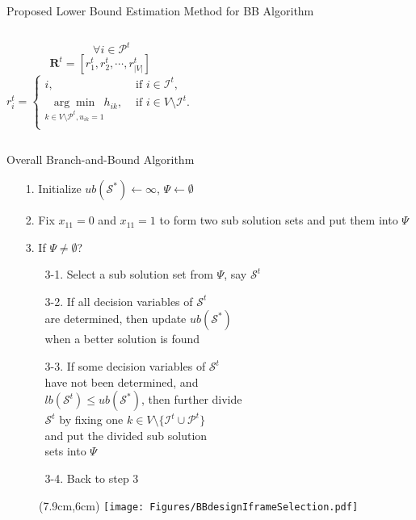 \begin{frame}{Proposed Lower Bound Estimation Method for BB Algorithm}
\begin{columns}
{\begin{equation*}
\quad \quad \forall i \in \mathcal{P}^t
\label{eq::infColumn}
\end{equation*}
}
%
{\tiny
\begin{equation*}
\mathbf{R}^t = [r_1^t,r_2^t,\cdots,r_{|V|}^t]
\end{equation*}
}
%
{\tiny
\begin{equation*}
r_i^t = 
\left\{ \begin{array}{cc}
i,  &\text{ if $i \in \mathcal{I}^t$,} \\                  	   
\underset{k \in V \setminus \mathcal{P}^t, u_{ik}=1}{\arg\min} h_{ik},  &\text{ if $i \in V\setminus \mathcal{I}^t$.} \\
\end{array} \right.
\label{eq::initRefStructure}
\end{equation*}
}
\end{columns}
\end{frame}
\begin{frame}{Overall Branch-and-Bound Algorithm}
\begin{itemize}
	\item[1.] Initialize $ub(\mathcal{S}^*) \gets \infty$, $\Psi \gets \emptyset$
	\item[2.] Fix $x_{11} = 0$ and $x_{11} = 1$ to form two sub solution sets and put them into $\Psi$
	\item[3.] If $\Psi \neq \emptyset$?
	\begin{itemize}
		\item[3-1.] Select a sub solution set from $\Psi$, say $\mathcal{S}^t$
		\item[3-2.] If all decision variables of $\mathcal{S}^t$ \\
		 			are determined, then update $ub(\mathcal{S}^*)$ \\
		 			when a better solution is found
		\item[3-3.] If some decision variables of $\mathcal{S}^t$ \\
					have not been determined, and \\
					{\small $lb(\mathcal{S}^t) \leq ub(\mathcal{S}^*)$}, then further divide \\
					$\mathcal{S}^t$ by fixing one {\small $k \in V \setminus \{\mathcal{I}^t \cup \mathcal{P}^t\}$} \\
					and put the divided sub solution \\
					sets into $\Psi$
		\item[3-4.] Back to step 3
	\end{itemize}
\end{itemize}
%
\begin{figure}
\centering
\begin{textblock*}{1cm}(7.9cm,6cm) %
\texttt{[image: Figures/BBdesignIframeSelection.pdf]}
\end{textblock*}
\end{figure}
%
\end{frame}